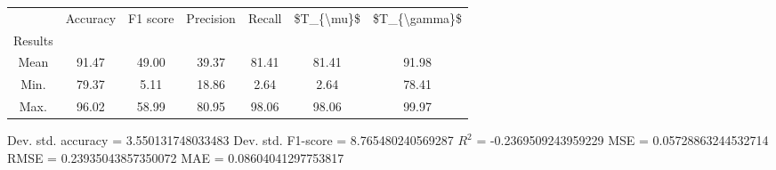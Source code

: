 \begin{tabular}{|c|c|c|c|c|c|c|}
\toprule
{} &  Accuracy &  F1 score &  Precision &  Recall &  \$T\_\{\textbackslash mu\}\$ &  \$T\_\{\textbackslash gamma\}\$ \\
Results &           &           &            &         &            &               \\
\hline
Mean    &     91.47 &     49.00 &      39.37 &   81.41 &      81.41 &         91.98 \\
Min.    &     79.37 &      5.11 &      18.86 &    2.64 &       2.64 &         78.41 \\
Max.    &     96.02 &     58.99 &      80.95 &   98.06 &      98.06 &         99.97 \\
\bottomrule
\end{tabular}

 Dev. std. accuracy = 3.550131748033483
 Dev. std. F1-score = 8.765480240569287
 $R^2$ = -0.2369509243959229
 MSE = 0.05728863244532714
 RMSE = 0.23935043857350072
 MAE = 0.08604041297753817